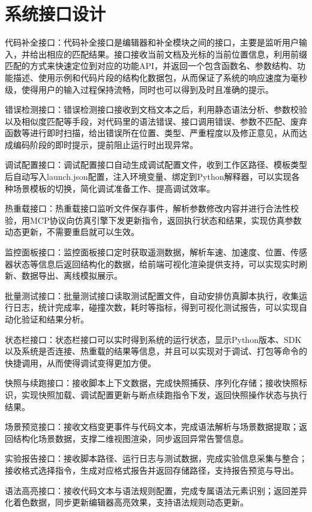 \section{系统接口设计}

代码补全接口：代码补全接口是编辑器和补全模块之间的接口，主要是监听用户输入，并给出相应的匹配结果。接口接收当前文档及光标的当前位置信息，利用前缀匹配的方式来快速定位到对应的功能API，并返回一个包含函数名、参数结构、功能描述、使用示例和代码片段的结构化数据包，从而保证了系统的响应速度为毫秒级，使得用户的输入过程保持流畅，同时也可以得到及时且准确的提示。

错误检测接口：错误检测接口接收到文档文本之后，利用静态语法分析、参数校验以及相似度匹配等手段，对代码里的语法错误、接口调用错误、参数不匹配、废弃函数等进行即时扫描，给出错误所在位置、类型、严重程度以及修正意见，从而达成编码阶段的即时提示，提前阻止运行时出现异常。

调试配置接口：调试配置接口自动生成调试配置文件，收到工作区路径、模板类型后自动写入launch.json配置，注入环境变量、绑定到Python解释器，可以实现各种场景模板的切换，简化调试准备工作、提高调试效率。

热重载接口：热重载接口监听文件保存事件，解析参数修改内容并进行合法性校验，用MCP协议向仿真引擎下发更新指令，返回执行状态和结果，实现仿真参数动态更新，不需要重启就可以生效。

监控面板接口：监控面板接口定时获取遥测数据，解析车速、加速度、位置、传感器状态等信息后返回结构化的数据，给前端可视化渲染提供支持，可以实现实时刷新、数据导出、离线模拟展示。

批量测试接口：批量测试接口读取测试配置文件，自动安排仿真脚本执行，收集运行日志，统计完成率，碰撞次数，耗时等指标，得到可视化测试报告，可以实现自动化验证和结果分析。

状态栏接口：状态栏接口可以实时得到系统的运行状态，显示Python版本、SDK以及系统是否连接、热重载的结果等信息，并且可以实现对于调试、打包等命令的快捷调用，从而使得调试变得更加方便。

快照与续跑接口：接收脚本上下文数据，完成快照捕获、序列化存储；接收快照标识，实现快照加载、调试配置更新与断点续跑指令下发，返回快照操作状态与执行结果。

场景预览接口：接收文档变更事件与代码文本，完成语法解析与场景数据提取；返回结构化场景数据，支撑二维视图渲染，同步返回异常告警信息。

实验报告接口：接收脚本路径、运行日志与测试数据，完成实验信息采集与整合；接收格式选择指令，生成对应格式报告并返回存储路径，支持报告预览与导出。

语法高亮接口：接收代码文本与语法规则配置，完成专属语法元素识别；返回差异化着色数据，同步更新编辑器高亮效果，支持语法规则动态更新。

